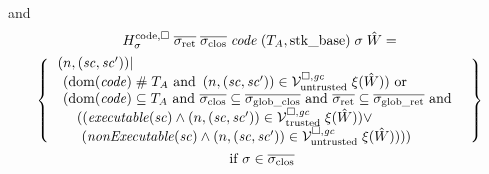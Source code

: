 and
\begin{multline*}
  H^\mathrm{code,\square}_\sigma \; \sigrets \; \sigcloss \; \code \;
  (\ta,\stkb) \; \sigma \; \hat{W}= \\
  \left\{
    \begin{array}{l}
\left. \npair{(\vsc, \vsc' )} \middle| \right. \\
      \begin{array}{l}
        (\dom(\code) \mathrel{\#} \ta \tand \npair{(\vsc,\vsc')} \in \lrv \; \xi(\hat{W})) \tor\\
        (\dom(\code) \subseteq \ta \tand \sigcloss \subseteq \gsigcloss \tand \sigrets \subseteq \gsigrets \tand \\
         \quad((\exec{\vsc} \wedge \npair{(\vsc,\vsc')} \in \lrvtrusted \; \xi(\hat{W})) \vee\\
         \quad\ (\nonExec{\vsc} \wedge\npair{(\vsc,\vsc')} \in \lrv \; \xi(\hat{W}))))
      \end{array}
    \end{array}
  \right\}\\
  \text{ if } \sigma \in \sigcloss
\end{multline*}

